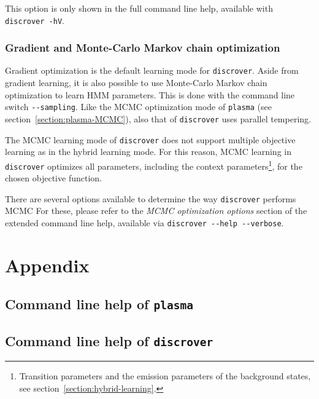 \documentclass[a4paper]{article}
\newcommand{\plasma}[0]{\texttt{plasma}}
\newcommand{\discrover}[0]{\texttt{discrover}}
\begin{document}
This option is only shown in the full command line help, available with \verb|discrover -hV|.

\subsubsection{Gradient and Monte-Carlo Markov chain optimization}
Gradient optimization is the default learning mode for \discrover{}.
Aside from gradient learning, it is also possible to use Monte-Carlo Markov chain optimization to learn HMM parameters.
This is done with the command line switch \verb|--sampling|.
Like the MCMC optimization mode of \plasma{} (see section~\ref{section:plasma-MCMC}), also that of \discrover{} uses parallel tempering.

The MCMC learning mode of \discrover{} does not support multiple objective learning as in the hybrid learning mode.
For this reason, MCMC learning in \discrover{} optimizes all parameters, including the context parameters\footnote{Transition parameters and the emission parameters of the background states, see section~\ref{section:hybrid-learning}.}, for the chosen objective function.

There are several options available to determine the way \discrover{} performs MCMC
For these, please refer to the \emph{MCMC optimization options} section of the extended command line help, available via \verb|discrover --help --verbose|.

\section{Appendix}
\subsection{Command line help of \plasma{}}
\label{appendix:plasma-cli-help}
{%
  \footnotesize
  
}

\subsection{Command line help of \discrover{}}
\label{appendix:discrover-cli-help}
{%
  \footnotesize
  
}



\nocite{*}
{}


\end{document}
